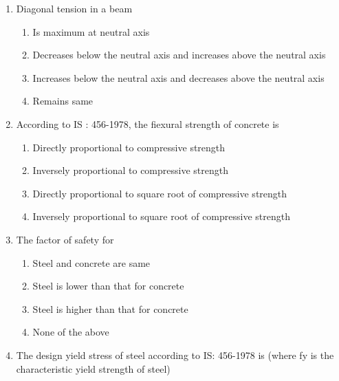 \documentclass[11pt,a4paper]{article}
\begin{document}
\begin{enumerate}
{Reason R: The live loads are more uncertain than dead loads. \\

Select your answer based on the coding system given below:}
\begin{enumerate}[label=\Alph*.]
\item{Both A and R are true and R is the correct explanation of A}
\item{Both A and R are true but R is not the correct explanation of A}
\item{A is true but R is false}
\item{A is false but R is true}
\end{enumerate}
\item{Diagonal tension in a beam}
\begin{enumerate}[label=\Alph*.]
\item{Is maximum at neutral axis}
\item{Decreases below the neutral axis and increases above the neutral axis}
\item{Increases below the neutral axis and decreases above the neutral axis}
\item{Remains same}
\end{enumerate}
\item{According to IS : 456-1978, the fiexural strength of concrete is}
\begin{enumerate}[label=\Alph*.]
\item{Directly proportional to compressive strength}
\item{Inversely proportional to compressive strength}
\item{Directly proportional to square root of compressive strength}
\item{Inversely proportional to square root of compressive strength}
\end{enumerate}
\item{The factor of safety for}
\begin{enumerate}[label=\Alph*.]
\item{Steel and concrete are same}
\item{Steel is lower than that for concrete}
\item{Steel is higher than that for concrete}
\item{None of the above}
\end{enumerate}
\item{The design yield stress of steel according to IS: 456-1978 is (where fy is the characteristic yield strength of steel)}
\\\begin{enumerate*}[itemjoin=\qquad, label=\Alph*.]

\end{enumerate*}
\end{enumerate}
\end{document}
